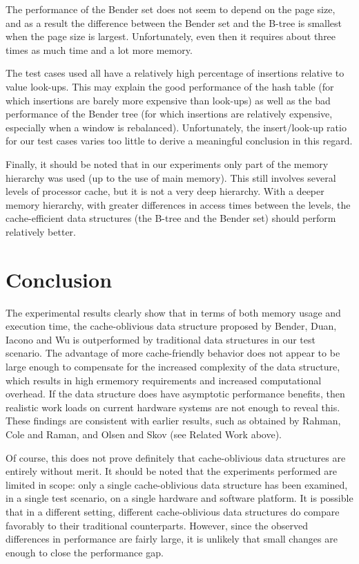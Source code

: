 \documentclass{acm_proc_article-sp}
\begin{document}
The performance of the Bender set does not seem to depend on the page size,
and as a result the difference between the Bender set and the B-tree is smallest
when the page size is largest. Unfortunately, even then it requires about three
times as much time and a lot more memory.

The test cases used all have a relatively high percentage of insertions relative
to value look-ups. This may explain the good performance of the hash table (for
which insertions are barely more expensive than look-ups) as well as the bad
performance of the Bender tree (for which insertions are relatively expensive,
especially when a window is rebalanced). Unfortunately, the insert/look-up
ratio for our test cases varies too little to derive a meaningful conclusion
in this regard.

Finally, it should be noted that in our experiments only part of the memory
hierarchy was used (up to the use of main memory). This still involves several
levels of processor cache, but it is not a very deep hierarchy. With a deeper
memory hierarchy, with greater differences in access times between the levels,
the cache-efficient data structures (the B-tree and the Bender set) should
perform relatively better.

\section{Conclusion}
The experimental results clearly show that in terms of both memory usage and
execution time, the cache-oblivious data structure proposed by Bender, Duan,
Iacono and Wu is outperformed by traditional data structures in our test scenario.
The advantage of more cache-friendly behavior does not appear to be large enough
to compensate for the increased complexity of the data structure, which results in
high ermemory requirements and increased computational overhead.
If the data structure does have asymptotic performance benefits, then realistic
work loads on current hardware systems are not enough to reveal this.
These findings are consistent with earlier results, such as obtained by
Rahman, Cole and Raman, and Olsen and Skov (see Related Work above).

Of course, this does not prove definitely that cache-oblivious data structures
are entirely without merit. It should be noted that the experiments performed
are limited in scope: only a single cache-oblivious data structure has been
examined, in a single test scenario, on a single hardware
and software platform. It is possible that in a different setting,
different cache-oblivious data structures do compare favorably to their traditional
counterparts. However, since the observed differences in performance are fairly
large, it is unlikely that small changes are enough to close the performance gap.
\end{document}
